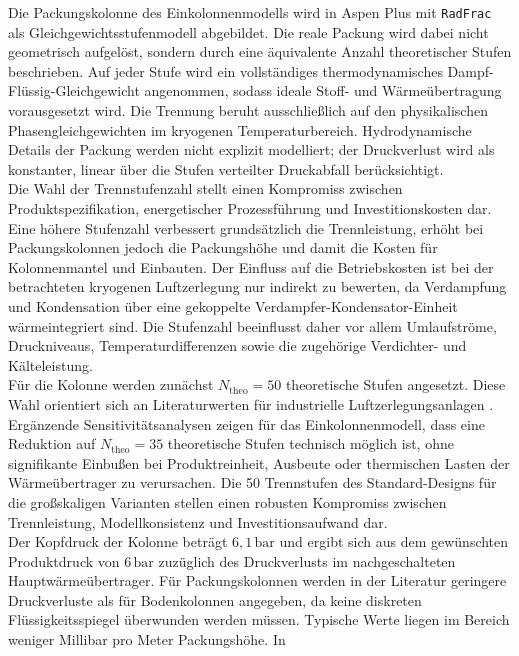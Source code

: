Die Packungskolonne des Einkolonnenmodells wird in Aspen Plus mit
\texttt{RadFrac} als Gleichgewichtsstufenmodell abgebildet. Die reale Packung
wird dabei nicht geometrisch aufgelöst, sondern durch eine äquivalente Anzahl
theoretischer Stufen beschrieben. Auf jeder Stufe wird ein vollständiges
thermodynamisches Dampf-Flüssig-Gleichgewicht angenommen, sodass ideale Stoff-
und Wärmeübertragung vorausgesetzt wird. Die Trennung beruht ausschließlich auf
den physikalischen Phasengleichgewichten im kryogenen Temperaturbereich.
Hydrodynamische Details der Packung werden nicht explizit modelliert; der
Druckverlust wird als konstanter, linear über die Stufen verteilter Druckabfall
berücksichtigt. \\
Die Wahl der Trennstufenzahl stellt einen Kompromiss zwischen
Produktspezifikation, energetischer Prozessführung und Investitionskosten dar.
Eine höhere Stufenzahl verbessert grundsätzlich die Trennleistung, erhöht bei
Packungskolonnen jedoch die Packungshöhe und damit die Kosten für
Kolonnenmantel und Einbauten. Der Einfluss auf die Betriebskosten ist bei der
betrachteten kryogenen Luftzerlegung nur indirekt zu bewerten, da Verdampfung
und Kondensation über eine gekoppelte Verdampfer-Kondensator-Einheit
wärmeintegriert sind. Die Stufenzahl beeinflusst daher vor allem Umlaufströme,
Druckniveaus, Temperaturdifferenzen sowie die zugehörige Verdichter- und
Kälteleistung.\\
Für die Kolonne werden zunächst \(N_{\text{theo}}=50\) theoretische Stufen
angesetzt. Diese Wahl orientiert sich an Literaturwerten für industrielle
Luftzerlegungsanlagen
\cite{teschExergybasedMethodsApplied, agrawalEfficientCryogenicNitrogen1991, vanderhamExergyAnalysisTwo2010}. Ergänzende Sensitivitätsanalysen zeigen für
das Einkolonnenmodell, dass eine Reduktion auf \(N_{\text{theo}}=35\)
theoretische Stufen technisch möglich ist, ohne signifikante Einbußen bei
Produktreinheit, Ausbeute oder thermischen Lasten der Wärmeübertrager zu
verursachen. Die 50 Trennstufen des Standard-Designs für die großskaligen Varianten stellen einen robusten Kompromiss
zwischen Trennleistung, Modellkonsistenz und Investitionsaufwand dar.\\
Der Kopfdruck der Kolonne beträgt \(6{,}1\,\mathrm{bar}\) und ergibt sich aus
dem gewünschten Produktdruck von \(6\,\mathrm{bar}\) zuzüglich des
Druckverlusts im nachgeschalteten Hauptwärmeübertrager. Für Packungskolonnen
werden in der Literatur geringere Druckverluste als für Bodenkolonnen
angegeben, da keine diskreten Flüssigkeitsspiegel überwunden werden müssen.
Typische Werte liegen im Bereich weniger Millibar pro Meter Packungshöhe. In
